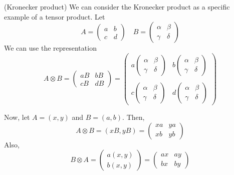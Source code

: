 \begin{ex}
(Kronecker product) We can consider the Kronecker product as a specific example of a tensor product. Let
\[A=\begin{pmatrix}
a&b\\c&d
\end{pmatrix}\quad B=\begin{pmatrix}
\alpha &\beta \\\gamma &\delta 
\end{pmatrix}
\]
We can use the representation
\[A\otimes B=\begin{pmatrix}
aB&bB\\cB&dB
\end{pmatrix}=\begin{pmatrix}
a\begin{pmatrix}
\alpha &\beta \\\gamma &\delta 
\end{pmatrix}&b\begin{pmatrix}
\alpha &\beta \\\gamma &\delta 
\end{pmatrix}\\\\c\begin{pmatrix}
\alpha &\beta \\\gamma &\delta 
\end{pmatrix}&d\begin{pmatrix}
\alpha &\beta \\\gamma &\delta 
\end{pmatrix}
\end{pmatrix}
\]
\end{ex}
\vspace{2ex}
\begin{ex}
Now, let $A=(x,y)$ and $B=(a,b)$. Then,
\[A\otimes B=(xB,yB)=\begin{pmatrix}
xa&ya\\xb&yb
\end{pmatrix}
\]
Also,
\[B\otimes A=\begin{pmatrix}
a(x,y)\\b(x,y)
\end{pmatrix}
=\begin{pmatrix}
ax&ay\\bx&by
\end{pmatrix}\]
\end{ex}
\vspace{2ex}
